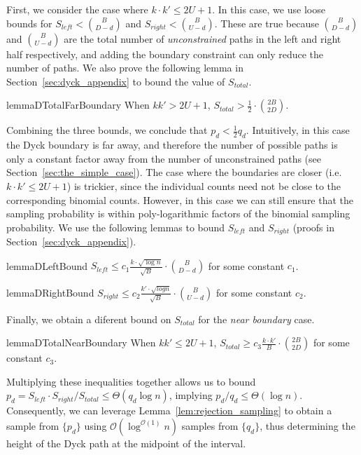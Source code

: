 First, we consider the case where $k\cdot k'\le 2U+1$.
In this case, we use loose bounds for $S_{left} < \binom{B}{D-d}$ and $S_{right} < \binom{B}{U-d}$.
These are true because $\binom{B}{D-d}$ and $\binom{B}{U-d}$ are the total number of \emph{unconstrained} paths
in the left and right half respectively, and adding the boundary constraint can only reduce the number of paths.
We also prove the following lemma in Section~\ref{sec:dyck_appendix} to bound the value of $S_{total}$.
\begin{restatable}{lemma}{DTotalFarBoundary}
\label{lem:DTotalFarBoundary}
When $kk' > 2U + 1$, $S_{total} > \frac 12\cdot \binom{2B}{2D}$.
\end{restatable}

Combining the three bounds, we conclude that $p_d < \frac 12 q_d$.
Intuitively, in this case the Dyck boundary is far away, and therefore the number of possible paths
is only a constant factor away from the number of unconstrained paths (see Section~\ref{sec:the_simple_case}).
The case where the boundaries are closer (i.e. $k\cdot k' \le 2U+1$) is trickier,
since the individual counts need not be close to the corresponding binomial counts.
However, in this case we can still ensure that the sampling probability is within poly-logarithmic factors of the binomial sampling probability.
We use the following lemmas to bound $S_{left}$ and $S_{right}$ (proofs in Section~\ref{sec:dyck_appendix}).
\begin{restatable}{lemma}{DLeftBound}
\label{lem:DLeftBound}
$S_{left} \le c_1 \frac{ k\cdot\sqrt{\log n}}{\sqrt{B}}\cdot{{B}\choose{D-d}}$ for some constant $c_1$.
\end{restatable}
\begin{restatable}{lemma}{DRightBound}
\label{lem:DRightBound}
$S_{right} \le c_2 \frac{k'\cdot \sqrt{log n}}{\sqrt{B}}\cdot{{B}\choose{U-d}}$ for some constant $c_2$.
\end{restatable}

Finally, we obtain a diferent bound on $S_{total}$ for the \emph{near boundary} case.
\begin{restatable}{lemma}{DTotalNearBoundary}
\label{lem:DTotalNearBoundary}
When $kk' \le 2U + 1$, $S_{total} \ge c_3 \frac{k\cdot k'}{B}\cdot{{2B}\choose{2D}}$ for some constant $c_3$.
\end{restatable}

Multiplying these inequalities together allows us to bound $p_d = S_{left}\cdot S_{right}/S_{total} \le \Theta(q_d\log n)$,
implying $p_d/q_d \le \Theta(\log n)$.
Consequently, we can leverage Lemma~\ref{lem:rejection_sampling} to obtain a sample from $\{ p_d\}$
using $\mathcal O(\log^{\mathcal O(1)}n)$ samples from $\{ q_d\}$,
thus determining the height of the Dyck path at the midpoint of the interval.

